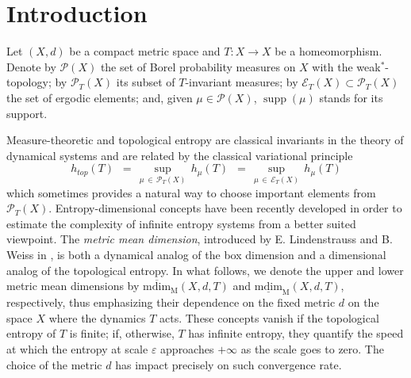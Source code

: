 \documentclass[11pt,a4paper,reqno]{amsart}
\theoremstyle{plain}
\theoremstyle{definition}
\newcommand{\cP}{{\mathcal P}}
\newcommand{\cE}{{\mathcal E}}
\newcommand{\supp}{\operatorname{{supp}}}
\begin{document}
\maketitle

\tiny
\normalsize

\section{Introduction}

Let $(X,d)$ be a compact metric space and $T\colon X \to X$ be a homeomorphism. Denote by $\mathcal{P}(X)$ the set of Borel probability measures on $X$ with the weak$^*$-topology; by $\mathcal{P}_T(X)$ its subset of $T$-invariant measures; by $\mathcal{E}_T(X) \subset \mathcal{P}_T(X)$ the set of ergodic elements; and, given $\mu \in \mathcal{P}(X)$, $\supp(\mu)$ stands for its support. 

\smallskip


Measure-theoretic and topological entropy are classical invariants in the theory of dynamical systems and are related by the classical variational principle 
\begin{equation}\label{Classical_VP_Entropy}
    h_{top}(T) \,\,\, = \, \sup_{\mu \, \in \, \cP_T(X)}\, h_{\mu}(T) \,\, \,= \, \sup_{\mu \, \in \, \cE_T(X)}\, h_{\mu}(T)
\end{equation}
which sometimes provides a natural way to choose important elements from $\cP_T(X)$. Entropy-dimensional concepts have been recently developed in order to estimate the complexity of infinite entropy systems from a better suited viewpoint. The \emph{metric mean dimension}, introduced by E. Lindenstrauss and B. Weiss in \cite{LW2000}, is both a dynamical analog of the box dimension and a dimensional analog of the topological entropy. In what follows, we denote the upper and lower metric mean dimensions by $\mathrm{\overline{mdim}_M}(X,d,T)$ and $\mathrm{\underline{mdim}_M}(X,d,T)$, respectively, thus emphasizing their dependence on the fixed metric $d$ on the space $X$ where the dynamics $T$ acts. These concepts vanish if the topological entropy of $T$ is finite; if, otherwise, $T$ has infinite entropy, they quantify the speed at which the entropy at scale $\varepsilon$ approaches $+\infty$ as the scale goes to zero. The choice of the metric $d$ has impact precisely on such convergence rate.
\end{document}

